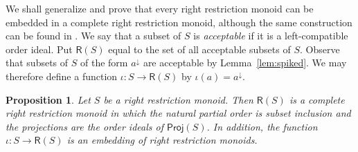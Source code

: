 \documentclass[a4paper]{amsart}
\newtheorem{proposition}[theorem]{Proposition}
\begin{document}
We shall generalize \cite{Schein} and prove that every right restriction monoid can be embedded in a complete right restriction monoid,
although the same construction can be found in \cite{CG}. 
We say that a subset of $S$ is {\em acceptable} if it is a left-compatible order ideal. 
Put $\mathsf{R}(S)$ equal to the set of all acceptable subsets of $S$.
Observe that subsets of $S$ of the form $a^{\downarrow}$ are acceptable by Lemma~\ref{lem:spiked}.
We may therefore define a function $\iota \colon S \rightarrow \mathsf{R}(S)$ by $\iota (a) = a^{\downarrow}$.

\begin{proposition}\label{prop:completion} Let $S$ be a right restriction monoid.
Then $\mathsf{R}(S)$ is a complete right restriction monoid
in which the natural partial order is subset inclusion and the projections are the order ideals of $\mathsf{Proj}(S)$.
In addition, the function  $\iota \colon S \rightarrow \mathsf{R}(S)$ is an embedding of right restriction monoids.
\end{proposition}  
\end{document}
